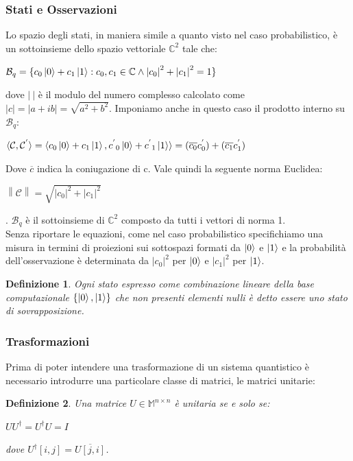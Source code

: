 \documentclass[12pt,a4paper,openright]{report}
\newcommand{\norm}[1]{\left\lVert#1\right\rVert}
\newtheorem{mydef}{Definizione}[chapter]
\begin{document}
\subsubsection{Stati e Osservazioni}

Lo spazio degli stati, in maniera simile a quanto visto nel caso probabilistico, è un sottoinsieme dello spazio vettoriale $\mathbb{C}^2$ tale che:
\begin{center}
    $\mathcal{B}_q=\{c_0\ket0 + c_1\ket1 : c_0,c_1 \in \mathbb{C} \land {\left\vert{c_0}\right\vert}^2 + {\left\vert{c_1}\right\vert}^2 = 1 \} $
\end{center}
dove $\left\vert{\:}\right\vert$ è il modulo del numero complesso calcolato come $\left\vert{c}\right\vert = \left\vert{a + ib}\right\vert = \sqrt{a^2 + b^2}$.
Imponiamo anche in questo caso il prodotto interno su $\mathcal{B}_q$:
\begin{center}
    $\langle\mathcal{C},\mathcal{C^{'}}\rangle=\langle c_0\ket0 + c_1\ket1, {c^{'}}_0\ket0 + {c^{'}}_1\ket1 \rangle = (\overline{c_0}c^{'}_0) + (\overline{c_1}c^{'}_1)$
\end{center}
Dove $\overline{c}$ indica la coniugazione di c. Vale quindi la seguente norma Euclidea:
\begin{center}
    $\norm{\mathcal{C}}= \sqrt{{\left\vert{c_0}\right\vert}^2 + {\left\vert{c_1}\right\vert}^2}$
\end{center}
. $\mathcal{B}_q$ è il sottoinsieme di $\mathbb{C}^2$ composto da tutti i vettori di norma 1.\\
Senza riportare le equazioni, come nel caso probabilistico specifichiamo una misura in termini di proiezioni sui sottospazi formati da $\ket0$ e $\ket1$ e la probabilità 
dell'osservazione è determinata da ${\left\vert{c_0}\right\vert}^2$ per $\ket0$ e  ${\left\vert{c_1}\right\vert}^2$ per $\ket1$.

\begin{mydef}
    Ogni stato espresso come combinazione lineare della base computazionale $\{\ket0,\ket1\}$ che non presenti elementi nulli è detto essere uno 
    stato di sovrapposizione.
\end{mydef}
\subsubsection{Trasformazioni}
Prima di poter intendere una trasformazione di un sistema quantistico è necessario introdurre una particolare classe di matrici, le matrici unitarie:\newpage
\begin{mydef}
    Una matrice $U\in\mathbb{M}^{n\times{n}}$ è unitaria se e solo se:
    \begin{center}
        $UU^\dag=U^{\dag}U=I$
    \end{center} 
    dove $U^{\dag}[i,j]=\overline{U[j,i]}$.
\end{mydef}
\end{document}
